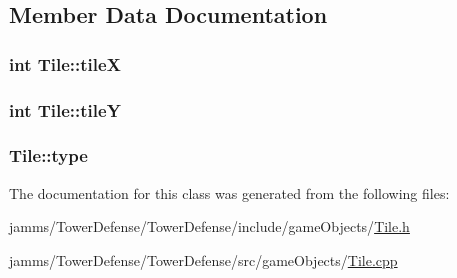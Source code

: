 \subsection{Member Data Documentation}
\hypertarget{class_tile_ac3f88f7a9c6ec1d0c9640ebb9a6ae73a}{
\subsubsection[{tile\+X}]{\setlength{\rightskip}{0pt plus 5cm}int Tile\+::tile\+X\hspace{0.3cm}{\ttfamily [private]}}}\label{class_tile_ac3f88f7a9c6ec1d0c9640ebb9a6ae73a}
\hypertarget{class_tile_a3fbe8c6bce65bc408ae0d028e43f4672}{
\subsubsection[{tile\+Y}]{\setlength{\rightskip}{0pt plus 5cm}int Tile\+::tile\+Y\hspace{0.3cm}{\ttfamily [private]}}}\label{class_tile_a3fbe8c6bce65bc408ae0d028e43f4672}
\hypertarget{class_tile_aa14fdeba327537c1e3250be58b63fc50}{
\subsubsection[{type}]{ Tile\+::type\hspace{0.3cm}{\ttfamily [private]}}}\label{class_tile_aa14fdeba327537c1e3250be58b63fc50}


The documentation for this class was generated from the following files\+:\begin{DoxyCompactItemize}
\item 
jamms/\+Tower\+Defense/\+Tower\+Defense/include/game\+Objects/\hyperlink{_tile_8h}{Tile.\+h}\item 
jamms/\+Tower\+Defense/\+Tower\+Defense/src/game\+Objects/\hyperlink{_tile_8cpp}{Tile.\+cpp}\end{DoxyCompactItemize}
